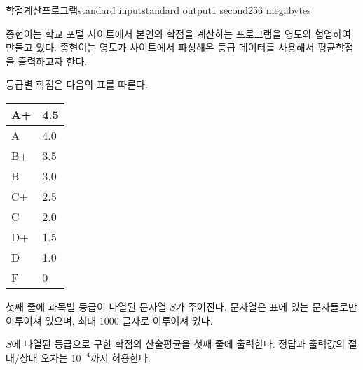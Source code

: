\begin{problem}{학점계산프로그램}{standard input}{standard output}{1 second}{256 megabytes}

종현이는 학교 포털 사이트에서 본인의 학점을 계산하는 프로그램을 영도와 협업하여 만들고 있다. 종현이는 영도가 사이트에서 파싱해온 등급 데이터를 사용해서 평균학점을 출력하고자 한다. 

등급별 학점은 다음의 표를 따른다.

\begin{table}
\begin{tabular}{|l|l|}
\hline
A+ & 4.5 \\ \hline
A  & 4.0 \\ \hline
B+ & 3.5 \\ \hline
B  & 3.0 \\ \hline
C+ & 2.5 \\ \hline
C  & 2.0 \\ \hline
D+ & 1.5 \\ \hline
D  & 1.0 \\ \hline
F  & 0   \\ \hline
\end{tabular}
\end{table}

\InputFile
첫째 줄에 과목별 등급이 나열된 문자열 $S$가 주어진다. 문자열은 표에 있는 문자들로만 이루어져 있으며, 최대 $1000$ 글자로 이루어져 있다.

\OutputFile
$S$에 나열된 등급으로 구한 학점의 산술평균을 첫째 줄에 출력한다. 정답과 출력값의 절대/상대 오차는 $10^{-4}$까지 허용한다.

\Examples

\begin{example}
%
%
%
\end{example}

\end{problem}

